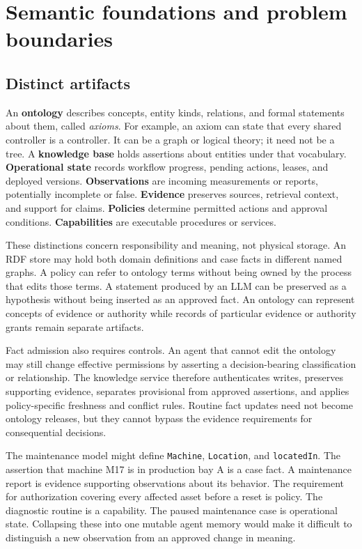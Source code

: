 \documentclass[preprint,12pt,authoryear]{elsarticle}
\begin{document}
\section{Semantic foundations and problem
boundaries}\label{semantic-foundations-and-problem-boundaries}

\subsection{Distinct artifacts}\label{distinct-artifacts}

An \textbf{ontology} describes concepts, entity kinds, relations, and
formal statements about them, called \emph{axioms}. For example, an
axiom can state that every shared controller is a controller. It can be
a graph or logical theory; it need not be a tree. A \textbf{knowledge
base} holds assertions about entities under that vocabulary.
\textbf{Operational state} records workflow progress, pending actions,
leases, and deployed versions. \textbf{Observations} are incoming
measurements or reports, potentially incomplete or false.
\textbf{Evidence} preserves sources, retrieval context, and support for
claims. \textbf{Policies} determine permitted actions and approval
conditions. \textbf{Capabilities} are executable procedures or services.

These distinctions concern responsibility and meaning, not physical
storage. An RDF store may hold both domain definitions and case facts in
different named graphs. A policy can refer to ontology terms without
being owned by the process that edits those terms. A statement produced
by an LLM can be preserved as a hypothesis without being inserted as an
approved fact. An ontology can represent concepts of evidence or
authority while records of particular evidence or authority grants
remain separate artifacts.

Fact admission also requires controls. An agent that cannot edit the
ontology may still change effective permissions by asserting a
decision-bearing classification or relationship. The knowledge service
therefore authenticates writes, preserves supporting evidence, separates
provisional from approved assertions, and applies policy-specific
freshness and conflict rules. Routine fact updates need not become
ontology releases, but they cannot bypass the evidence requirements for
consequential decisions.

The maintenance model might define \texttt{Machine}, \texttt{Location},
and \texttt{locatedIn}. The assertion that machine M17 is in production
bay A is a case fact. A maintenance report is evidence supporting
observations about its behavior. The requirement for authorization
covering every affected asset before a reset is policy. The diagnostic
routine is a capability. The paused maintenance case is operational
state. Collapsing these into one mutable agent memory would make it
difficult to distinguish a new observation from an approved change in
meaning.
\end{document}
